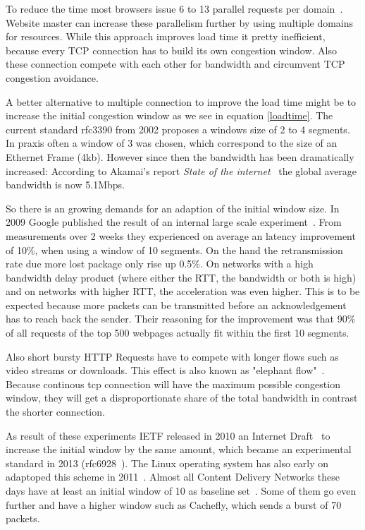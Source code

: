 To reduce the time most browsers issue 6 to 13 parallel requests per
domain~\cite{browserscope}. Website master can increase these parallelism
further by using multiple domains for resources. While this approach improves
load time it pretty inefficient, because every TCP connection has to build its
own congestion window. Also these connection compete with each other for
bandwidth and circumvent TCP congestion avoidance.

A better alternative to multiple connection to improve the load time might be to
increase the initial congestion window as we see in equation \ref{loadtime}. The
current standard rfc3390 from 2002 proposes a windows size of 2 to 4 segments.
In praxis often a window of 3 was chosen, which correspond to the size of an
Ethernet Frame (4kb). However since then the bandwidth has been dramatically
increased: According to Akamai's report \emph{State of the
internet}~\cite{q3-2015-soti-connectivity-final} the global average bandwidth is
now 5.1Mbps.

So there is an growing demands for an adaption of the initial window size. In
2009 Google published the result of an internal large scale
experiment~\cite{36640}. From measurements over 2 weeks they experienced on
average an latency improvement of 10\%, when using a window of 10 segments. On
the hand the retransmission rate due more lost package only rise up 0.5\%. On
networks with a high bandwidth delay product (where either the RTT, the
bandwidth or both is high) and on networks with higher RTT, the acceleration was
even higher. This is to be expected because more packets can be transmitted
before an acknowledgement has to reach back the sender. Their reasoning for the
improvement was that 90\% of all requests of the top 500 webpages actually fit
within the first 10 segments.

Also short bursty HTTP Requests have to compete with longer flows such as
video streams or downloads. This effect is also known as "elephant
flow"~\cite{992898}. Because continous tcp connection will have the maximum
possible congestion window, they will get a disproportionate share of the total
bandwidth in contrast the shorter connection.

As result of these experiments IETF released in 2010 an Internet
Draft~\cite{draft-ietf-tcpm-initcwnd-00} to increase the initial window by the
same amount, which became an experimental standard in 2013
(rfc6928~\cite{rfc6928}). The Linux operating system has also early on adaptoped
this scheme in 2011~\cite{linux}. Almost all Content Delivery Networks these
days have at least an initial window of 10 as baseline set~\cite{cdnplanet}.
Some of them go even further and have a higher window such as Cachefly, which
sends a burst of 70 packets.
